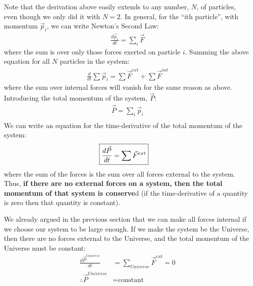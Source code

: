 Note that the derivation above easily extends to any number, $N$, of particles, even though we only did it with $N=2$. In general, for the ``ith particle'', with momentum $\vec p_i$, we can write Newton's Second Law:
\begin{align*}
\frac{d\vec p_i}{dt}=\sum_i \vec F
\end{align*} 
where the sum is over only those forces exerted on particle $i$. Summing the above equation for all $N$ particles in the system:
\begin{align*}
\frac{d}{dt}\sum \vec p_i=\sum \vec F^{ext} + \sum \vec F^{int}
\end{align*}
where the sum over internal forces will vanish for the same reason as above. Introducing the total momentum of the system, $\vec P$:
\begin{align*}
\vec P = \sum_i \vec p_i\\
\end{align*}
We can write an equation for the time-derivative of the total momentum of the system:
\begin{align}
\Aboxed{\frac{d\vec P}{dt} &= \sum \vec F^{ext}}
\end{align}
where the sum of the forces is the sum over all forces external to the system. Thus, \textbf{if there are no external forces on a system, then the total momentum of that system is conserve}d (if the time-derivative of a quantity is zero then that quantity is constant).

We already argued in the previous section that we can make all forces internal if we choose our system to be large enough. If we make the system be the Universe, then there are no forces external to the Universe, and the total momentum of the Universe must be constant:
\begin{align*}
\frac{d\vec P^{Universe}}{dt} &= \sum_{Universe} \vec F^{ext} = 0 \\
\therefore \vec P^{Universe}&=\text{constant}
\end{align*}

